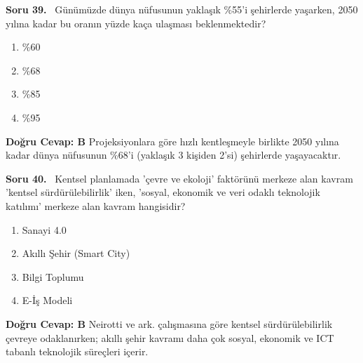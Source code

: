 \documentclass[11pt,a4paper,openany]{book}
\begin{document}
\needspace{5cm}
\vspace{8pt}
\noindent\textbf{\large\sffamily Soru 39.} \ Günümüzde dünya nüfusunun yaklaşık \%55'i şehirlerde yaşarken, 2050 yılına kadar bu oranın yüzde kaça ulaşması beklenmektedir?
\begin{enumerate}[label=\Alph*), leftmargin=25pt, topsep=4pt, itemsep=2pt]
    \item \%60
    \item \%68
    \item \%85
    \item \%95
\end{enumerate}
\vspace{4pt}
\begin{tcolorbox}[title=Cevap ve Açıklama, colback=gray!3!white, colframe=primarycolor!90!black, arc=2mm, fonttitle=\bfseries\sffamily, top=6pt, bottom=6pt]
    \textbf{Doğru Cevap: B}
    \vspace{2pt}
    Projeksiyonlara göre hızlı kentleşmeyle birlikte 2050 yılına kadar dünya nüfusunun \%68'i (yaklaşık 3 kişiden 2'si) şehirlerde yaşayacaktır.
\end{tcolorbox}
\vspace{10pt}

\needspace{5cm}
\vspace{8pt}
\noindent\textbf{\large\sffamily Soru 40.} \ Kentsel planlamada 'çevre ve ekoloji' faktörünü merkeze alan kavram 'kentsel sürdürülebilirlik' iken, 'sosyal, ekonomik ve veri odaklı teknolojik katılımı' merkeze alan kavram hangisidir?
\begin{enumerate}[label=\Alph*), leftmargin=25pt, topsep=4pt, itemsep=2pt]
    \item Sanayi 4.0
    \item Akıllı Şehir (Smart City)
    \item Bilgi Toplumu
    \item E-İş Modeli
\end{enumerate}
\vspace{4pt}
\begin{tcolorbox}[title=Cevap ve Açıklama, colback=gray!3!white, colframe=primarycolor!90!black, arc=2mm, fonttitle=\bfseries\sffamily, top=6pt, bottom=6pt]
    \textbf{Doğru Cevap: B}
    \vspace{2pt}
    Neirotti ve ark. çalışmasına göre kentsel sürdürülebilirlik çevreye odaklanırken; akıllı şehir kavramı daha çok sosyal, ekonomik ve ICT tabanlı teknolojik süreçleri içerir.
\end{tcolorbox}
\vspace{10pt}
\end{document}
